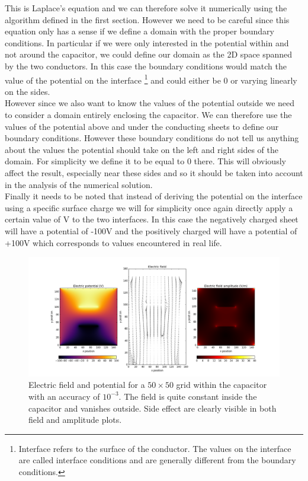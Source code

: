 \documentclass[10 pt]{article}
\numberwithin{equation}{section}
\begin{document}
\begin{multicols}{2}
This is Laplace's equation and we can therefore solve it numerically using the algorithm defined in the first section. However we need to be careful since this equation only has a sense if we define a domain with the proper boundary conditions. In particular if we were only interested in the potential within and not around the capacitor, we could define our domain as the 2D space spanned by the two conductors. In this case the boundary conditions would match the value of the potential on the interface \footnote{Interface refers to the surface of the conductor. The values on the interface are called interface conditions and are generally different from the boundary conditions.} and could either be 0 or varying linearly on the sides.\\
However since we also want to know the values of the potential outside we need to consider a domain entirely enclosing the capacitor. We can therefore use the values of the potential above and under the conducting sheets to define our boundary conditions. However these boundary conditions do not tell us anything about the values the potential should take on the left and right sides of the domain. For simplicity we define it to be equal to 0 there. This will obviously affect the result, especially near these sides and so it should be taken into account in the analysis of the numerical solution.\\
Finally it needs to be noted that instead of deriving the potential on the interface using a specific surface charge we will for simplicity once again directly apply a certain value of V to the two interfaces. In this case the negatively charged sheet will have a potential of -100V and the positively charged will have a potential of +100V which corresponds to values encountered in real life.

\end{multicols}

\begin{figure}[H]
\includegraphics[width=\linewidth]{Electric_field_potential}
\caption{Electric field and potential for a $50 \times 50$ grid within the capacitor with an accuracy of $10^{-3}$. The field is quite constant inside the capacitor and vanishes outside. Side effect are clearly visible in both field and amplitude plots.}
\end{figure}
\end{document}
